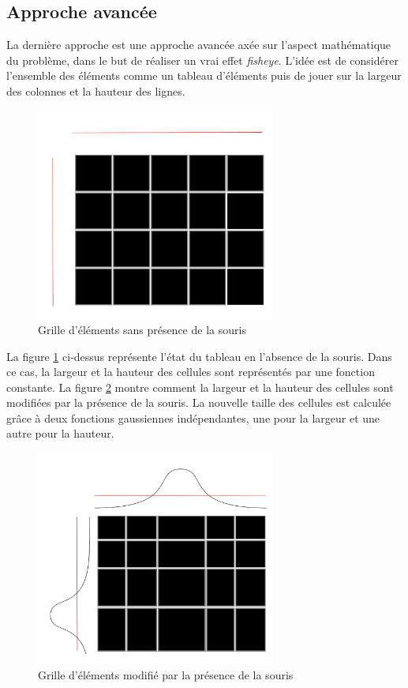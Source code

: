 \subsection{Approche avancée}

La dernière approche est une approche avancée axée sur l'aspect mathématique du problème, dans le but de réaliser un \og vrai \fg{} effet \emph{fisheye}. L'idée est de considérer l'ensemble des éléments comme un tableau d'éléments puis de jouer sur la largeur des colonnes et la hauteur des lignes.

\begin{figure}[H]
  \centering
  \includegraphics[width=0.7\textwidth]{../resources/illustrations/js_1}
  \caption{Grille d'éléments sans présence de la souris}
  \label{fig:js_1}
\end{figure}

La figure \ref{fig:js_1} ci-dessus représente l'état du tableau en
l'absence de la souris. Dans ce cas, la largeur et la hauteur des
cellules sont représentés par une fonction constante. La figure
\ref{fig:js_2} montre comment la largeur et la hauteur des cellules
sont modifiées par la présence de la souris. La nouvelle taille des
cellules est calculée grâce à deux fonctions gaussiennes indépendantes,
une pour la largeur et une autre pour la hauteur.  

\begin{figure}[H]
  \centering
  \includegraphics[width=0.7\textwidth]{../resources/illustrations/js_2}
  \caption{Grille d'éléments modifié par la présence de la souris}
    \label{fig:js_2}
\end{figure}

